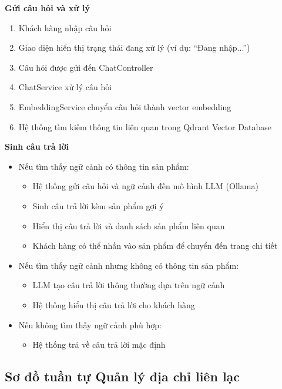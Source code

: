 \textbf{Gửi câu hỏi và xử lý}

\begin{enumerate}[noitemsep]
    \item Khách hàng nhập câu hỏi
    \item Giao diện hiển thị trạng thái đang xử lý (ví dụ: ``Đang nhập...'')
    \item Câu hỏi được gửi đến ChatController
    \item ChatService xử lý câu hỏi
    \item EmbeddingService chuyển câu hỏi thành vector embedding
    \item Hệ thống tìm kiếm thông tin liên quan trong Qdrant Vector Database
\end{enumerate}

\textbf{Sinh câu trả lời}

\begin{itemize}[noitemsep]
    \item Nếu tìm thấy ngữ cảnh có thông tin sản phẩm:
    \begin{itemize}
        \item Hệ thống gửi câu hỏi và ngữ cảnh đến mô hình LLM (Ollama)
        \item Sinh câu trả lời kèm sản phẩm gợi ý
        \item Hiển thị câu trả lời và danh sách sản phẩm liên quan
        \item Khách hàng có thể nhấn vào sản phẩm để chuyển đến trang chi tiết
    \end{itemize}

    \item Nếu tìm thấy ngữ cảnh nhưng không có thông tin sản phẩm:
    \begin{itemize}
        \item LLM tạo câu trả lời thông thường dựa trên ngữ cảnh
        \item Hệ thống hiển thị câu trả lời cho khách hàng
    \end{itemize}

    \item Nếu không tìm thấy ngữ cảnh phù hợp:
    \begin{itemize}
        \item Hệ thống trả về câu trả lời mặc định
    \end{itemize}
\end{itemize}


\subsection{Sơ đồ tuần tự Quản lý địa chỉ liên lạc}

